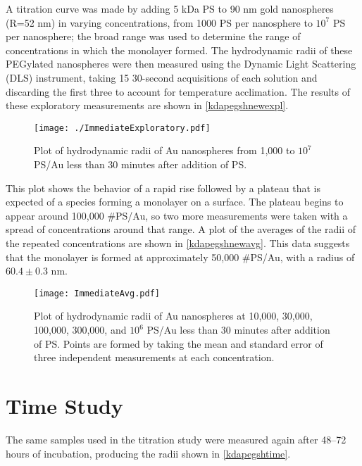 A titration curve was made by adding 5 kDa PS to 90 nm gold nanospheres (R=52 nm) in varying concentrations, from 1000 PS per nanosphere to $10^7$ PS per nanosphere; the broad range was used to determine the range of concentrations in which the monolayer formed. The hydrodynamic radii of these PEGylated nanospheres were then measured using the Dynamic Light Scattering (DLS) instrument, taking 15 30-second acquisitions of each solution and discarding the first three to account for temperature acclimation. The results of these exploratory measurements are shown in \autoref{kdapegshnewexpl}.

\begin{figure}[htbp]
\centering
\texttt{[image: ./ImmediateExploratory.pdf]}
\caption{Plot of hydrodynamic radii of Au nanospheres from 1,000 to $10^7$ PS\slash Au less than 30 minutes after addition of PS.}
\label{kdapegshnewexpl}
\end{figure}



This plot shows the behavior of a rapid rise followed by a plateau that is expected of a species forming a monolayer on a surface. The plateau begins to appear around 100,000 \#PS\slash Au, so two more measurements were taken with a spread of concentrations around that range. A plot of the averages of the radii of the repeated concentrations are shown in \autoref{kdapegshnewavg}. This data suggests that the monolayer is formed at approximately 50,000 \#PS\slash Au, with a radius of $60.4\pm0.3$ nm.

\begin{figure}[htbp]
\centering
\texttt{[image: ImmediateAvg.pdf]}
\caption{Plot of hydrodynamic radii of Au nanospheres at 10,000, 30,000, 100,000, 300,000, and $10^6$ PS\slash Au less than 30 minutes after addition of PS. Points are formed by taking the mean and standard error of three independent measurements at each concentration.}
\label{kdapegshnewavg}
\end{figure}



\section{Time Study}
\label{timestudy}

The same samples used in the titration study were measured again after 48--72 hours of incubation, producing the radii shown in \autoref{kdapegshtime}.

